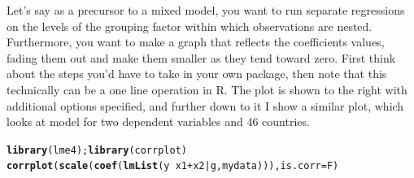 \documentclass[english,nohyper,titlepage]{tufte-handout}\usepackage[]{graphicx}\usepackage[]{color}
\makeatletter
\newcommand{\hlopt}[1]{\textcolor[rgb]{0,0,0}{#1}}%
\newcommand{\hlstd}[1]{\textcolor[rgb]{0.345,0.345,0.345}{#1}}%
\newcommand{\hlkwc}[1]{\textcolor[rgb]{0.333,0.667,0.333}{#1}}%
\newcommand{\hlkwd}[1]{\textcolor[rgb]{0.737,0.353,0.396}{\textbf{#1}}}%
\newenvironment{kframe}{%
 \def\at@end@of@kframe{}%
 \ifinner\ifhmode%
  \def\at@end@of@kframe{\end{minipage}}%
  \begin{minipage}{\columnwidth}%
 \fi\fi%
 \def\FrameCommand##1{\hskip\@totalleftmargin \hskip-\fboxsep
 \colorbox{shadecolor}{##1}\hskip-\fboxsep
     \hskip-\linewidth \hskip-\@totalleftmargin \hskip\columnwidth}%
 \MakeFramed {\advance\hsize-\width
   \@totalleftmargin\z@ \linewidth\hsize
   \@setminipage}}%
 {\par\unskip\endMakeFramed%
 \at@end@of@kframe}
\newenvironment{knitrout}{}{} %
\makeatother
\begin{document}
Let's say as a precursor to a mixed model, you want to run separate regressions on the levels of the grouping factor within which observations are nested.  Furthermore, you want to make a graph that reflects the coefficients values, fading them out and make them smaller as they tend toward zero.  First think about the steps you'd have to take in your own package, then note that this technically can be a one line operation in R. The plot is shown to the right with additional options specified, and further down to it I show a similar plot, which looks at model for two dependent variables and 46 countries.

\begin{knitrout}\footnotesize
{}\color{fgcolor}\begin{kframe}
\begin{alltt}
\hlkwd{library}\hlstd{(lme4);} \hlkwd{library}\hlstd{(corrplot)}
\hlkwd{corrplot}\hlstd{(}\hlkwd{scale}\hlstd{(}\hlkwd{coef}\hlstd{(}\hlkwd{lmList}\hlstd{(y} \hlopt{~} \hlstd{x1} \hlopt{+} \hlstd{x2} \hlopt{|} \hlstd{g, mydata))),} \hlkwc{is.corr}\hlstd{=F)}
\end{alltt}
\end{kframe}
\end{knitrout}
\end{document}

